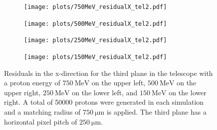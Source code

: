 \begin{figure}[H]
  \hspace{-0.4cm}
  \begin{subfigure}{0.51\textwidth}
      \centering
      \texttt{[image: plots/750MeV\_residualX\_tel2.pdf]}
  \end{subfigure}
  \begin{subfigure}{0.51\textwidth}
      \hspace{-0.13cm}
      \texttt{[image: plots/500MeV\_residualX\_tel2.pdf]}
  \end{subfigure}
  \begin{subfigure}{0.51\textwidth}
      \hspace{-0.4cm}
      \texttt{[image: plots/250MeV\_residualX\_tel2.pdf]}
  \end{subfigure}
  \begin{subfigure}{0.51\textwidth}
      \hspace{-0.4cm}
      \hspace{-0.13cm}
      \texttt{[image: plots/150MeV\_residualX\_tel2.pdf]}
  \end{subfigure}
  \caption{Residuals in the x-direction for the third plane in the telescope with a proton energy of $\SI{750}{\mega\eV}$ on the upper left, $\SI{500}{\mega\eV}$ on the
  upper right, $\SI{250}{\mega\eV}$ on the lower left,
  and $\SI{150}{\mega\eV}$ on the lower right. A total of 50000 protons were generated in each simulation and a matching radius of $\SI{750}{\micro\meter}$ is applied. The third plane has
  a horizontal pixel pitch of $\SI{250}{\micro\meter}$.}
  \label{fig:low}
\end{figure}

